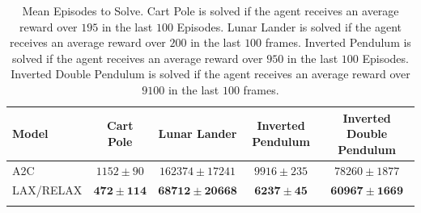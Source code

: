 \documentclass{article}
\begin{document}
\begin{table}[h]
\centering
\begin{tabular}{l | c c c c } 
\textbf{Model} & Cart Pole & Lunar Lander & Inverted Pendulum & Inverted Double Pendulum \\\midrule
A2C             & $1152 \pm 90$ & $162374 \pm 17241$                    & $9916 \pm 235$ & $78260 \pm 1877$  \\
LAX/RELAX & $\bm{472 \pm 114}$ & $\bm{68712 \pm 20668}$ & $\bm{6237 \pm 45}$ & $\bm{60967 \pm 1669}$\\\\
\end{tabular}
\caption{Mean Episodes to Solve. Cart Pole is solved if the agent receives an average reward over $195$ in the last $100$ Episodes. Lunar Lander is solved if the agent receives an average reward over $200$ in the last $100$ frames. Inverted Pendulum is solved if the agent receives an average reward over $950$ in the last $100$ Episodes. Inverted Double Pendulum is solved if the agent receives an average reward over $9100$ in the last $100$ frames.}
\label{tab:rl_results}
\end{table}
\end{document}
